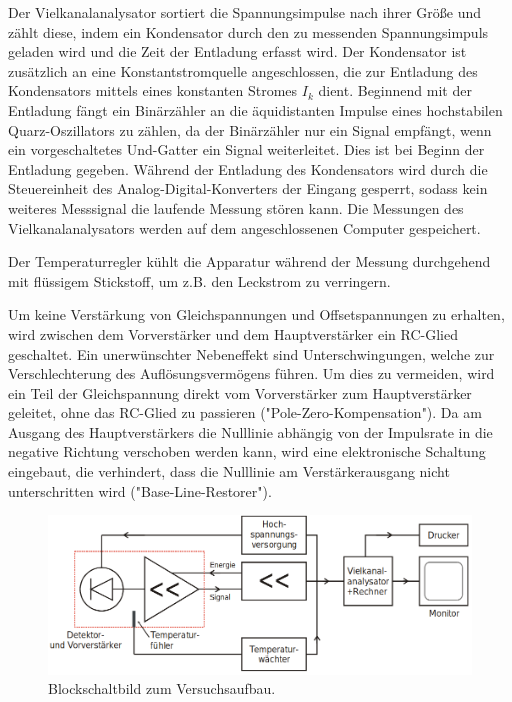 Der Vielkanalanalysator sortiert die Spannungsimpulse nach ihrer Größe und zählt
diese, indem ein Kondensator durch den zu messenden Spannungsimpuls geladen wird
und die Zeit der Entladung erfasst wird. Der Kondensator ist zusätzlich an eine
Konstantstromquelle angeschlossen, die zur Entladung des Kondensators mittels
eines konstanten Stromes $I_k$ dient. Beginnend mit der Entladung fängt ein
Binärzähler an die äquidistanten Impulse eines hochstabilen Quarz-Oszillators zu
zählen, da der Binärzähler nur ein Signal empfängt, wenn ein vorgeschaltetes
Und-Gatter ein Signal weiterleitet.  Dies ist bei Beginn der Entladung gegeben.
Während der Entladung des Kondensators wird durch die Steuereinheit des
Analog-Digital-Konverters der Eingang gesperrt, sodass kein weiteres Messsignal
die laufende Messung stören kann. Die Messungen des Vielkanalanalysators werden
auf dem angeschlossenen
Computer gespeichert.

Der Temperaturregler kühlt die Apparatur während der Messung durchgehend
mit flüssigem Stickstoff, um z.B. den Leckstrom zu verringern.






Um keine Verstärkung von Gleichspannungen und Offsetspannungen zu erhalten, wird
zwischen dem Vorverstärker und dem Hauptverstärker ein RC-Glied geschaltet. Ein
unerwünschter Nebeneffekt sind Unterschwingungen, welche zur Verschlechterung
des Auflösungsvermögens führen. Um dies zu vermeiden, wird ein Teil der
Gleichspannung direkt vom Vorverstärker zum Hauptverstärker geleitet, ohne das
RC-Glied zu passieren ("Pole-Zero-Kompensation").
Da am Ausgang des Hauptverstärkers die Nulllinie abhängig von der Impulsrate in
die negative Richtung verschoben werden kann, wird eine elektronische Schaltung
eingebaut, die verhindert, dass die Nulllinie am Verstärkerausgang nicht
unterschritten wird ("Base-Line-Restorer").

\begin{figure}
  \centering
  \includegraphics[scale=0.4]{Aufbau.png}
  \caption{Blockschaltbild zum Versuchsaufbau. \cite{Q1}}
  \label{abb:2}
\end{figure}



